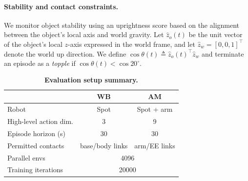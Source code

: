 \paragraph{Stability and contact constraints.}
We monitor object stability using an uprightness score based on the alignment between the object’s local axis and world gravity.
Let $\hat z_o(t)$ be the unit vector of the object’s local $z$-axis expressed in the world frame, and let $\hat z_w=[0,0,1]^\top$ denote the world up direction.
We define $\cos\theta(t) \triangleq \hat z_o(t)^\top \hat z_w$ and terminate an episode as a \emph{topple} if $\cos\theta(t) < \cos 20^{\circ}$.




\begin{table}[t]
\centering
\caption{\textbf{Evaluation setup summary.}}
\label{tab:setup_summary}
\scriptsize
\setlength{\tabcolsep}{5pt}
\renewcommand{\arraystretch}{1.}
\begin{tabular}{@{}p{2.9cm}cc@{}}
\toprule
 & \textbf{WB} & \textbf{AM} \\
\midrule
Robot & Spot  & Spot + arm \\
High-level action dim. & 3 & 9 \\
Episode horizon (s) & 30 & 30 \\
Permitted contacts & base/body links & arm/EE links \\
Parallel envs & \multicolumn{2}{c}{4096} \\
Training iterations & \multicolumn{2}{c}{20000} \\
\bottomrule
\end{tabular}
\vspace{-0.75em}
\end{table}


